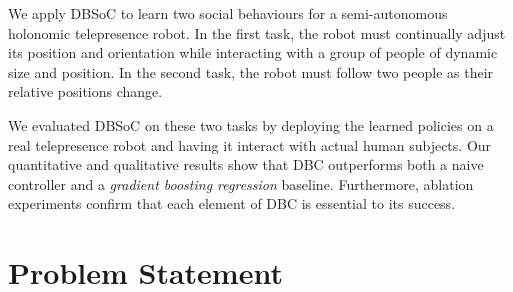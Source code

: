 \documentclass[letterpaper, 10 pt, conference]{ieeeconf}
\begin{document}

We apply DBSoC to learn two social behaviours for a semi-autonomous holonomic telepresence robot. In the first task, the robot must continually adjust its position and orientation while interacting with a group of people of dynamic size and position.  In the second task, the robot must follow two people as their relative positions change.

We evaluated DBSoC on these two tasks by deploying the learned policies on a real telepresence robot and having it interact with actual human subjects.  Our quantitative and qualitative results show that DBC outperforms both a naive controller and a \emph{gradient boosting regression} baseline.  Furthermore, ablation experiments confirm that each element of DBC is essential to its success.


\section{Problem Statement \label{sec:related_work}}
\end{document}
